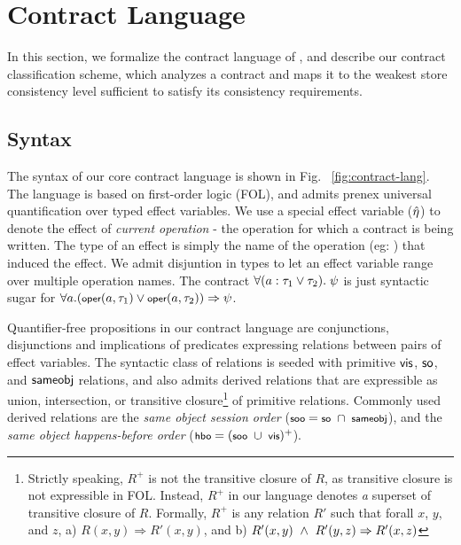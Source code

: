 \section{Contract Language}
\label{sec:contract-lang}



In this section, we formalize the contract language of \name, and describe our
contract classification scheme, which analyzes a contract and maps it to the
weakest store consistency level sufficient to satisfy its consistency
requirements.


\subsection{Syntax}

The syntax of our core contract language is shown in Fig.
~\ref{fig:contract-lang}. The language is based on first-order logic (FOL), and
admits prenex universal quantification over typed effect variables. We use a
special effect variable ($\hat{\eta}$) to denote the effect of \emph{current
operation} - the operation for which a contract is being written. The type of
an effect is simply the name of the operation (eg: ) that induced
the effect. We admit disjuntion in types to let an effect variable range over
multiple operation names. The contract $\small \forall (a : \tau_1 \vee
\tau_2).~\psi$ is just syntactic sugar for $\small \forall a. (\oper{a}{\tau_1}
\vee \oper{a}{\tau_2}) \Rightarrow \psi$.

Quantifier-free propositions in our contract language are conjunctions,
disjunctions and implications of predicates expressing relations between pairs
of effect variables. The syntactic class of relations is seeded with primitive
${\normalfont \textsf{vis}}$, ${\normalfont \textsf{so}}$, and ${\normalfont \textsf{sameobj}}$ relations, and also admits derived relations
that are expressible as union, intersection, or transitive
closure\footnote{Strictly speaking, $R^{+}$ is not the transitive closure of
$R$, as transitive closure is not expressible in FOL.  Instead, $R^{+}$ in our
language denotes \emph{a} superset of transitive closure of $R$. Formally,
$R^{+}$ is any relation $R'$ such that forall $x$, $y$, and $z$, a) $R(x,y)
\Rightarrow R'(x,y)$, and b) $R'(x,y) ~\wedge~ R'(y,z) \Rightarrow R'(x,z)$} of
primitive relations.  Commonly used derived relations are the \emph{same object
session order} ($\small \sooZ = \soZ ~\cap~ \sameobjZ$), and the \emph{same
object happens-before order} ($\small \hboZ = (\sooZ ~\cup~ \visZ)^+$).

